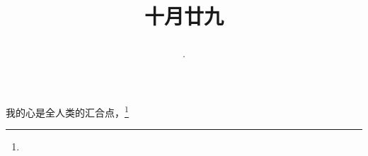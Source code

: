 \title{\date[d=29,m=11,y=2024][year:cn-y,年,month:cn,day:cn,日,·,weekday]·十月廿九 }
我的心是全人类的汇合点，\footnote{ }

